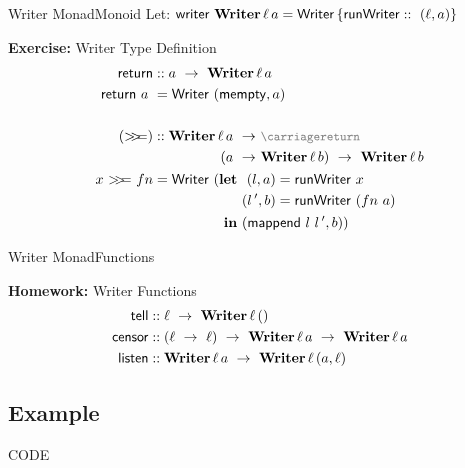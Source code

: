 \begin{frame}[fragile]{Writer Monad}{Monoid}
  Let: $\mathsf{writer}\ \mathbf{Writer}\,\ell\,a = \mathsf{Writer} \left\{ \mathsf{runWriter} ::\ (\ell, a) \right\}$
  \begin{block}{\textbf{Exercise: }Writer Type Definition}
    \begin{align*}
      \return &:: a\ \rightarrow\ \WriterM{a}\\
      \return\ a\ &= \mathsf{Writer}\ (\fn{mempty}, a)\\[1.5em]
      (\bind) &::
      \begin{aligned}[t]
        \WriterM{a}\ \rightarrow\ &{\text{\small\color{gray}\carriagereturn}}\\(a\ \rightarrow\ &\WriterM{b})\ \rightarrow\ \WriterM{b}
      \end{aligned}\\
      x\ \bind\ fn &=\mathsf{Writer}\ (
          \begin{aligned}[t]
            \mathbf{let}&\ 
            \begin{aligned}[t]
              (l, a) &= \fn{runWriter}\ x\\
              (l\,', b) &= \fn{runWriter}\ (fn\ a)
            \end{aligned}\\
            \mathbf{in}&\ (\fn{mappend}\ l\ l\,', b))
          \end{aligned}\\
    \end{align*}
  \end{block}
\end{frame}
\begin{frame}[fragile]{Writer Monad}{Functions}
    \begin{block}{\textbf{Homework: }Writer Functions}
      \begin{align*}
        \fn{tell} &:: \ell\ \rightarrow\ \WriterM{\unit}\\
        \fn{censor} &:: (\ell\ \rightarrow\ \ell)\ \rightarrow\ \WriterM{a}\ \rightarrow\ \WriterM{a}\\
        \fn{listen} &:: \WriterM{a}\ \rightarrow\ \WriterM{(a, \ell)}\\
      \end{align*}
    \end{block}
\end{frame}
\subsection{Example}
\begin{frame}
  \centering
  \begin{tcolorbox}[enhanced, size=minimal,auto outer arc,
    width=2.8cm,octogon arc, colback=red,colframe=white,colupper=white, fontupper=\fontsize{7mm}{7mm}\selectfont\bfseries\sffamily, halign=center,valign=center,
    square,arc is angular, borderline={1mm}{-3mm}{red} ]
    CODE
  \end{tcolorbox}
\end{frame}

